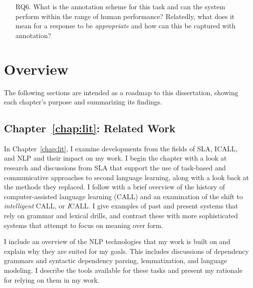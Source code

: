 \begin{itemize}
\item[RQ6.]{What is the annotation scheme for this task and can the system perform within the range of human performance? Relatedly, what does it mean for a response to be \textit{appropriate} and how can this be captured with annotation?}
\end{itemize}


\section{Overview}
\label{sec:overview}

The following sections are intended as a roadmap to this dissertation, showing each chapter's purpose and summarizing its findings.

\subsection{Chapter~\ref{chap:lit}: Related Work}

In Chapter~\ref{chap:lit}, I examine developments from the fields of SLA, ICALL, and NLP and their impact on my work. I begin the chapter with a look at research and discussions from SLA that support the use of task-based and communicative approaches to second language learning, along with a look back at the methods they replaced. I follow with a brief overview of the history of computer-assisted language learning (CALL) and an examination of the shift to \textit{intelligent} CALL, or \textit{I}CALL. I give examples of past and present systems that rely on grammar and lexical drills, and contrast these with more sophisticated systems that attempt to focus on meaning over form.

I include an overview of the NLP technologies that my work is built on and explain why they are suited for my goals. This includes discussions of dependency grammars and syntactic dependency parsing, lemmatization, and language modeling. I describe the tools available for these tasks and present my rationale for relying on them in my work.

